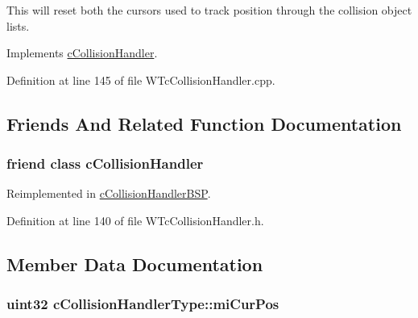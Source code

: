 This will reset both the cursors used to track position through the collision object lists. 



Implements \hyperlink{classc_collision_handler_a4fe00bffd2defe0a71a17c5fadd3b890}{cCollisionHandler}.



Definition at line 145 of file WTcCollisionHandler.cpp.



\subsection{Friends And Related Function Documentation}
\hypertarget{classc_collision_handler_type_a2dee8095fea5c5aa41fe4060393f31ad}{
\subsubsection[{cCollisionHandler}]{\setlength{\rightskip}{0pt plus 5cm}friend class {\bf cCollisionHandler}}}
\label{classc_collision_handler_type_a2dee8095fea5c5aa41fe4060393f31ad}


Reimplemented in \hyperlink{classc_collision_handler_b_s_p_a2dee8095fea5c5aa41fe4060393f31ad}{cCollisionHandlerBSP}.



Definition at line 140 of file WTcCollisionHandler.h.



\subsection{Member Data Documentation}
\hypertarget{classc_collision_handler_type_a56edc1dc263cc86212aa18a0a9334162}{
\subsubsection[{miCurPos}]{\setlength{\rightskip}{0pt plus 5cm}uint32 {\bf cCollisionHandlerType::miCurPos}}}
\label{classc_collision_handler_type_a56edc1dc263cc86212aa18a0a9334162}


